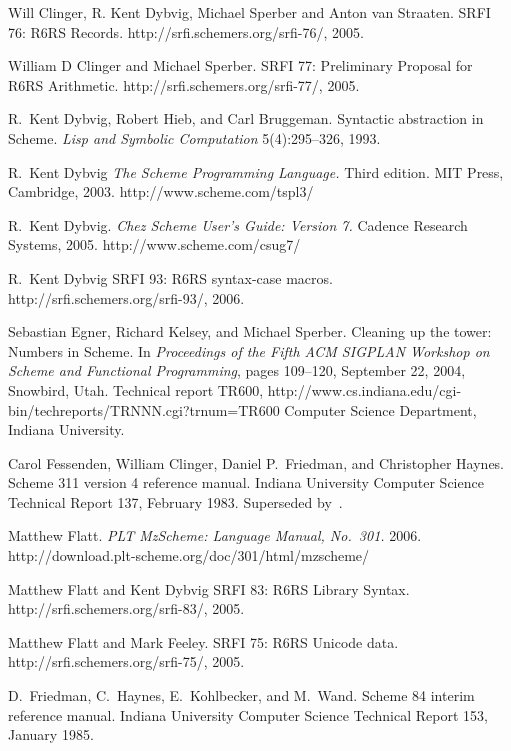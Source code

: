 \begin{thebibliography}{999}
Will Clinger, R. Kent Dybvig, Michael Sperber and Anton van Straaten.
SRFI 76: R6RS Records.
{\cf http://srfi.schemers.org/srfi-76/}, 2005.

William D Clinger and Michael Sperber.
SRFI 77: Preliminary Proposal for R6RS Arithmetic.
{\cf http://srfi.schemers.org/srfi-77/}, 2005.

R.~Kent Dybvig, Robert Hieb, and Carl Bruggeman.
Syntactic abstraction in Scheme.
{\em Lisp and Symbolic Computation} 5(4):295--326, 1993.

R.~Kent Dybvig
{\em The Scheme Programming Language.}
Third edition. MIT Press, Cambridge, 2003.
{\cf http://www.scheme.com/tspl3/}

R.~Kent Dybvig.
{\em Chez Scheme User's Guide: Version 7.}
Cadence Research Systems, 2005.
{\cf http://www.scheme.com/csug7/}

R.\ Kent Dybvig
SRFI 93: R6RS {\cf syntax-case} macros.
{\cf http://srfi.schemers.org/srfi-93/}, 2006.

Sebastian Egner, Richard Kelsey, and Michael Sperber.
Cleaning up the tower: Numbers in Scheme.
In {\em Proceedings of the Fifth ACM SIGPLAN
  Workshop on Scheme and Functional Programming},
pages 109--120,
September 22, 2004, Snowbird, Utah.
Technical report TR600,
{\cf http://www.cs.indiana.edu/\linebreak[1]cgi-bin/\linebreak[1]techreports/\linebreak[1]TRNNN.cgi?trnum=TR600}
Computer Science Department, Indiana University.

Carol Fessenden, William Clinger, Daniel P.~Friedman, and Christopher Haynes.
Scheme 311 version 4 reference manual.
Indiana University Computer Science Technical Report 137, February 1983.
Superseded by~\cite{Scheme84}.

Matthew Flatt.
{\em PLT MzScheme: Language Manual, No.~301.}
2006.
{\cf http://download.plt-scheme.org/doc/301/html/mzscheme/}

Matthew Flatt and Kent Dybvig
SRFI 83: R6RS Library Syntax.
{\cf http://srfi.schemers.org/srfi-83/}, 2005.
 
Matthew Flatt and Mark Feeley.
SRFI 75: R6RS Unicode data.
{\cf http://srfi.schemers.org/srfi-75/}, 2005.

D.~Friedman, C.~Haynes, E.~Kohlbecker, and M.~Wand.
Scheme 84 interim reference manual.
Indiana University Computer Science Technical Report 153, January 1985.


\end{thebibliography}

